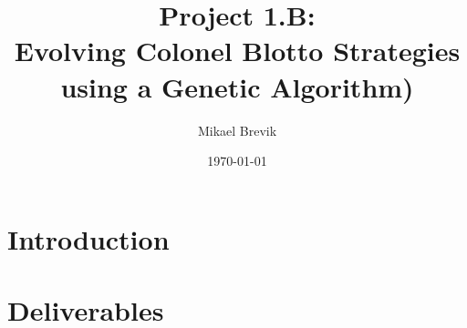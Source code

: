 \documentclass[a4paper, 11pt]{report}
\title{Project 1.B: \\ Evolving Colonel Blotto Strategies using a Genetic Algorithm)}
\author{Mikael Brevik}
\date{\today}
\begin{document}
\maketitle
\tableofcontents


\chapter{Introduction}


\chapter{Deliverables}	

\newpage

\newpage

\newpage


\newpage


\listoffigures
\end{document}
